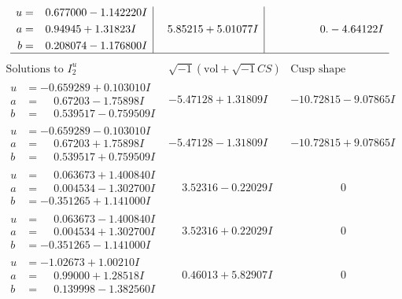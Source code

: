 \documentclass[1p]{elsarticle_modified}
\theoremstyle{definition}
\newcommand{\I}{\sqrt{-1}}
\begin{document}
$$\begin{array}{c|c|c}
\begin{aligned}
u &= \phantom{-}0.677000 - 1.142220 I \\
a &= \phantom{-}0.94945 + 1.31823 I \\
b &= \phantom{-}0.208074 - 1.176800 I\end{aligned}
 & \phantom{-}5.85215 + 5.01077 I & \phantom{-0.000000 } 0. - 4.64122 I\\
 \hline 
 \end{array}$$\newpage$$\begin{array}{c|c|c}  
\text{Solutions to }I^u_{2}& \I (\text{vol} + \sqrt{-1}CS) & \text{Cusp shape}\\
 \hline 
\begin{aligned}
u &= -0.659289 + 0.103010 I \\
a &= \phantom{-}0.67203 - 1.75898 I \\
b &= \phantom{-}0.539517 - 0.759509 I\end{aligned}
 & -5.47128 + 1.31809 I & -10.72815 - 9.07865 I \\ \hline\begin{aligned}
u &= -0.659289 - 0.103010 I \\
a &= \phantom{-}0.67203 + 1.75898 I \\
b &= \phantom{-}0.539517 + 0.759509 I\end{aligned}
 & -5.47128 - 1.31809 I & -10.72815 + 9.07865 I \\ \hline\begin{aligned}
u &= \phantom{-}0.063673 + 1.400840 I \\
a &= \phantom{-}0.004534 - 1.302700 I \\
b &= -0.351265 + 1.141000 I\end{aligned}
 & \phantom{-}3.52316 - 0.22029 I & \phantom{-0.000000 } 0 \\ \hline\begin{aligned}
u &= \phantom{-}0.063673 - 1.400840 I \\
a &= \phantom{-}0.004534 + 1.302700 I \\
b &= -0.351265 - 1.141000 I\end{aligned}
 & \phantom{-}3.52316 + 0.22029 I & \phantom{-0.000000 } 0 \\ \hline\begin{aligned}
u &= -1.02673 + 1.00210 I \\
a &= \phantom{-}0.99000 + 1.28518 I \\
b &= \phantom{-}0.139998 - 1.382560 I\end{aligned}
 & \phantom{-}0.46013 + 5.82907 I & \phantom{-0.000000 } 0 \\ \hline\begin{aligned}

\end{aligned}
\end{array}$$
\end{document}
